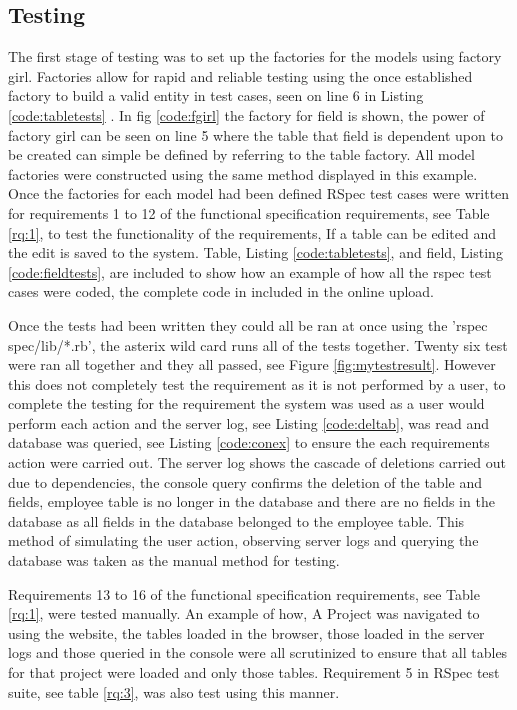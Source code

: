 \documentclass[a4paper,12pt]{article}
\begin{document}
\subsection{Testing}

\par The first stage of testing was to set up the factories for the models using factory girl\cite{fgirl}. Factories allow for rapid and reliable testing using the once established factory to build a valid entity in test cases, seen on line 6 in Listing \ref{code:tabletests} . In fig \ref{code:fgirl} the factory for field is shown, the power of factory girl can be seen on line 5 where the table that field is dependent upon to be created can simple be defined by referring to the table factory. All model factories were constructed using the same method displayed in this example. Once the factories for each model had been defined RSpec test cases were written for requirements 1 to 12 of the functional specification requirements, see Table \ref{rq:1}, to test the functionality of the requirements, If a table can be edited and the edit is saved to the system. Table,  Listing \ref{code:tabletests}, and field, Listing \ref{code:fieldtests}, are included to show how an example of how all the rspec test cases were coded, the complete code in included in the online upload.
\vspace{3mm}
\par Once the tests had been written they could all be ran at once using the 'rspec spec/lib/*.rb', the asterix wild card runs all of the tests together. Twenty six test were ran all together and they all passed, see Figure \ref{fig:mytestresult}. However this does not completely test the requirement as it is not performed by a user, to complete the testing for the requirement the system was used as a user would perform each action and the server log, see Listing \ref{code:deltab}, was read and database was queried, see Listing \ref{code:conex} to ensure the each requirements action were carried out. The server log shows the cascade of deletions carried out due to dependencies, the console query confirms the deletion of the table and fields, employee table is no longer in the database and there are no fields in the database as all fields in the database belonged to the employee table. This method of simulating the user action, observing server logs and querying the database was taken as the manual method for testing.
\vspace{3mm}
\par  Requirements 13 to 16 of the functional specification requirements, see Table \ref{rq:1}, were tested manually. An example of how, A Project was navigated to using the website, the tables loaded in the browser, those loaded in the server logs and those queried in the console were all scrutinized to ensure that all tables for that project were loaded and only those tables. Requirement 5 in RSpec test suite, see table \ref{rq:3}, was also test using this manner.
\end{document}
